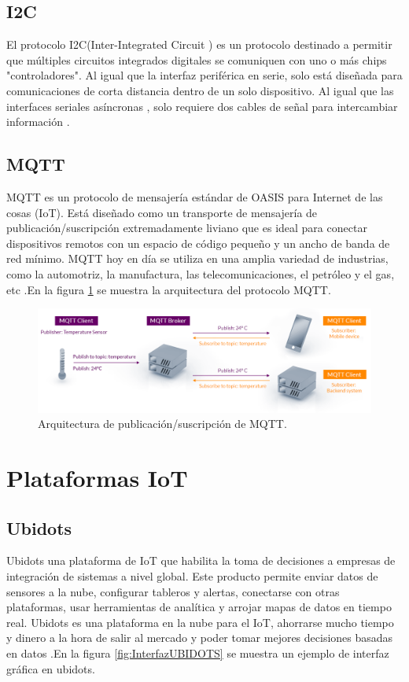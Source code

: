 \subsection{I2C}

El protocolo I2C(Inter-Integrated Circuit ) es un protocolo destinado a permitir que múltiples circuitos integrados digitales se comuniquen con uno o más chips "controladores". Al igual que la interfaz periférica en serie, solo está diseñada para comunicaciones de corta distancia dentro de un solo dispositivo. Al igual que las interfaces seriales asíncronas , solo requiere dos cables de señal para intercambiar información \citep{I2C}.

\subsection{MQTT}
MQTT es un protocolo de mensajería estándar de OASIS para Internet de las cosas (IoT). Está diseñado como un transporte de mensajería de publicación/suscripción extremadamente liviano que es ideal para conectar dispositivos remotos con un espacio de código pequeño y un ancho de banda de red mínimo. MQTT hoy en día se utiliza en una amplia variedad de industrias, como la automotriz, la manufactura, las telecomunicaciones, el petróleo y el gas, etc \citep{MQTT}.En la figura \ref{fig:ArquitecturaMQTT} se muestra la arquitectura del protocolo MQTT.

\begin{figure}[htbp]
	\centering
	\includegraphics[width=1\textwidth]{./Figures/mqtt-publish-subscribe.png}
	\caption{Arquitectura de publicación/suscripción de MQTT.}
	\label{fig:ArquitecturaMQTT}
\end{figure}
\section{Plataformas IoT}
\subsection{Ubidots}
Ubidots una plataforma de IoT que habilita la toma de decisiones a empresas de integración de sistemas a nivel global. Este producto permite enviar datos de sensores a la nube, configurar tableros y alertas, conectarse con otras plataformas, usar herramientas de analítica y arrojar mapas de datos en tiempo real.
Ubidots es una plataforma en la nube para el IoT, ahorrarse mucho tiempo y dinero a la hora de salir al mercado y poder tomar mejores decisiones basadas en datos \citep{InterfazIoTUbidots}.En la figura \ref{fig:InterfazUBIDOTS} se muestra un ejemplo de interfaz gráfica en ubidots.

